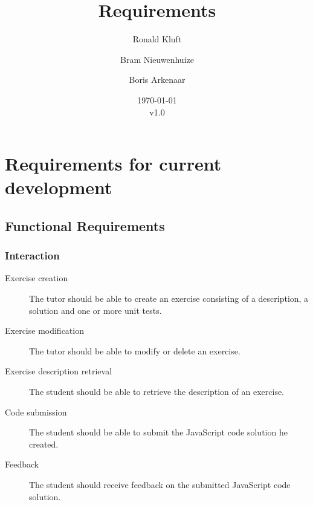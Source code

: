 \documentclass{article}
\begin{document}
\title{Requirements}
\author{Ronald Kluft \and Bram Nieuwenhuize \and Boris Arkenaar}
\date{\today\\v1.0}
\maketitle

\section{Requirements for current development}
\subsection{Functional Requirements}
\subsubsection{Interaction}
\begin{description}
  \item[Exercise creation] The tutor should be able to create an exercise
    consisting of a description, a solution and one or more unit tests.
  \item[Exercise modification] The tutor should be able to modify or delete an
    exercise.
  \item[Exercise description retrieval] The student should be able to retrieve
    the description of an exercise.
  \item[Code submission] The student should be able to submit the JavaScript 
    code solution he created.
  \item[Feedback] The student should receive feedback on the submitted 
    JavaScript code solution. 
\end{description}
\end{document}
